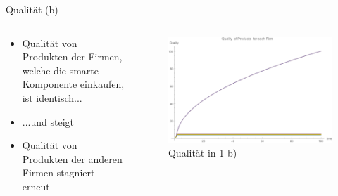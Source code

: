 \documentclass[xcolor={dvipsnames},10pt]{beamer}
\begin{document}
\begin{frame}{Qualität (b)}
\begin{columns}[T]
    \begin{column}{.3\textwidth}
      \begin{itemize}
      \item Qualität von Produkten der Firmen, welche die smarte Komponente einkaufen, ist identisch...
      \item ...und steigt
      \item Qualität von Produkten der anderen Firmen stagniert erneut 
      \end{itemize}
      \end{column}
      \begin{column}{.7\textwidth}
      \begin{figure}[t]
            \centering
            \includegraphics[scale=0.35]{../Plots/quality1b}
            \caption{Qualität in 1 b)}
            \label{fig:quality1b}
       \end{figure}
    \end{column}
  \end{columns}
\end{frame}
\end{document}
